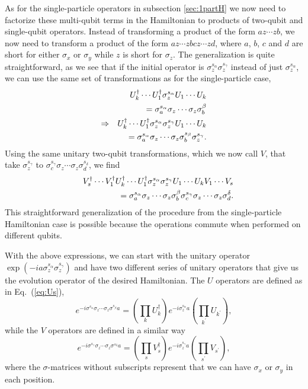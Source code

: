 \documentclass[aps,pra,twocolumn,floatfix]{revtex4}
\begin{document}
As for the single-particle operators in subsection \ref{sec:1partH}
we now need to factorize these multi-qubit 
terms in the Hamiltonian to
products of two-qubit and single-qubit operators.
Instead of transforming a product of the form $a z\cdots z b$, we now
need to transform a product of the form $a z\cdots zb cz\cdots zd$,
where $a$, $b$, $c$ and $d$ are short for either $\sigma_x$ or
$\sigma_y$ while $z$ is short for $\sigma_z$.  
The generalization is quite straightforward, as we see that if the
initial operator is $\sigma_z^{s_\alpha} \sigma_z^{s_\gamma}$ instead
of just $\sigma_z^{s_\alpha}$, we can use the same set of
transformations as for the single-particle case,
\begin{eqnarray}
&&U_k^\dag \cdots U_1^\dag \sigma_z^{s_\alpha} U_1 \cdots U_k 
\notag  \\ &&=
\sigma_a^{s_\alpha} 
\sigma_z \cdots \sigma_z \sigma_b^{\beta}
\notag \\
\Rightarrow&&  
U_k^\dag \cdots U_1^\dag \sigma_z^{s_\alpha} \sigma_z^{s_\gamma} 
U_1 \cdots U_k \notag \\
&&= \sigma_a^{s_\alpha}
\sigma_z \cdots \sigma_z \sigma_b^{s_\beta}  \sigma_z^{s_\gamma}.
\end{eqnarray}
Using the same unitary two-qubit transformations, which we now call 
$V$, 
that take $\sigma_z^{s_\gamma}$ to $\sigma_c^{s_\gamma} \sigma_z
\cdots \sigma_z \sigma_d^{s_\delta}$,
we find
\begin{eqnarray}
&&V_s^\dag\cdots V_1^\dag
U_k^\dag \cdots U_1^\dag \sigma_z^{s_\alpha}\sigma_z^{s_\gamma}
 U_1 \cdots U_k 
V_1\cdots V_s \notag \\
&&=
\sigma_a^{s_\alpha} 
\sigma_z \cdots \sigma_z \sigma_b^{\beta} 
\sigma_c^{s_\gamma} 
\sigma_z \cdots \sigma_z \sigma_d^{\delta}.
\end{eqnarray}
This straightforward generalization of the procedure from the single-particle
Hamiltonian case is possible because the operations commute when performed
on different qubits.


With the above expressions, we can start with
the unitary operator $\exp(-ia \sigma_z^{s_\alpha}\sigma_z^{s_\gamma})$
and have two different series of unitary operators that give us the
evolution operator of the desired Hamiltonian. 
The $U$ operators are defined as in 
Eq.~(\ref{eq:Us}),
\begin{equation}
e^{-i\sigma^{s_\alpha} \sigma_z \cdots \sigma_z
\sigma^{s_\beta}a}  
= \left(\prod_k U_k^\dag \right) e^{-i\sigma_z^{s_\alpha}a} 
\left(\prod_{k^\prime}
U_{k^\prime}\right),
\end{equation}
while the 
$V$ operators are defined in a similar way
\begin{equation}
e^{-i\sigma^{s_\gamma} \sigma_z \cdots \sigma_z
\sigma^{s_\delta}a}  
= \left(\prod_s V_s^\dag \right) e^{-i\sigma_z^{s_\gamma}a} 
\left(\prod_{s^\prime}
V_{s^\prime}\right),
\end{equation}
where the $\sigma$-matrices without subscripts represent that we can
have $\sigma_x$ or $\sigma_y$ in each position.
\end{document}
